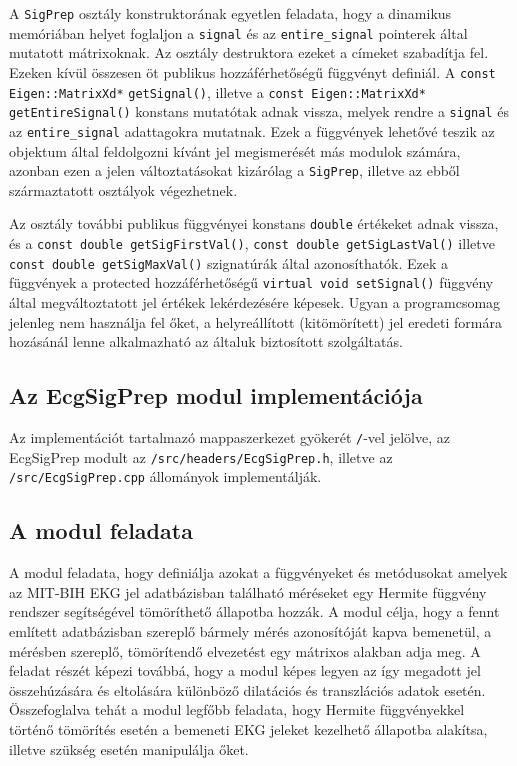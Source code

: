 \documentclass[oneside,titlepage,12pt,a4paper]{report}
\begin{document}
\par A \texttt{SigPrep} osztály konstruktorának egyetlen feladata, hogy a dinamikus memóriában helyet foglaljon a \texttt{signal} és az \texttt{entire\_signal} pointerek által mutatott mátrixoknak. Az osztály destruktora ezeket a címeket szabadítja fel.  Ezeken kívül összesen öt publikus hozzáférhetőségű függvényt definiál. \linebreak A \texttt{const Eigen::MatrixXd*} \texttt{getSignal()}, illetve a \texttt{const Eigen::MatrixXd*} \linebreak \texttt{getEntireSignal()} konstans mutatótak adnak vissza, melyek rendre a \texttt{signal} és az \texttt{entire\_signal} adattagokra mutatnak. Ezek a függvények lehetővé teszik az objektum által feldolgozni kívánt jel megismerését más modulok számára, azonban ezen a jelen változtatásokat kizárólag a \texttt{SigPrep}, illetve az ebből származtatott osztályok végezhetnek.
\par Az osztály további publikus függvényei konstans \texttt{double} értékeket adnak vissza, és a \texttt{const double getSigFirstVal()}, \texttt{const double getSigLastVal()} illetve \texttt{const double getSigMaxVal()} szignatúrák által azonosíthatók. Ezek a függvények a protected hozzáférhetőségű \texttt{virtual void setSignal()} függvény által megváltoztatott jel értékek lekérdezésére képesek. Ugyan a programcsomag jelenleg nem használja fel őket, a helyreállított (kitömörített) jel eredeti formára hozásánál lenne alkalmazható az általuk biztosított szolgáltatás.   


\subsection{Az EcgSigPrep modul implementációja}

Az implementációt tartalmazó mappaszerkezet gyökerét \texttt{/}-vel jelölve, az EcgSigPrep modult  az \texttt{/src/headers/EcgSigPrep.h}, illetve az \texttt{/src/EcgSigPrep.cpp} állományok implementálják. 

\subsection*{A modul feladata}

\par A modul feladata, hogy definiálja azokat a függvényeket és metódusokat amelyek az MIT-BIH EKG jel adatbázisban található méréseket egy Hermite függvény rendszer segítségével tömöríthető állapotba hozzák. A modul célja, hogy a fennt említett adatbázisban szereplő bármely mérés azonosítóját kapva bemenetül, a mérésben szereplő, tömörítendő elvezetést egy mátrixos alakban adja meg. A feladat részét képezi továbbá, hogy a modul képes legyen az így megadott jel összehúzására és eltolására különböző dilatációs és transzlációs adatok esetén. Összefoglalva tehát a modul legfőbb feladata, hogy Hermite függvényekkel történő tömörítés esetén a bemeneti EKG jeleket kezelhető állapotba alakítsa, illetve szükség esetén manipulálja őket.  
\end{document}
